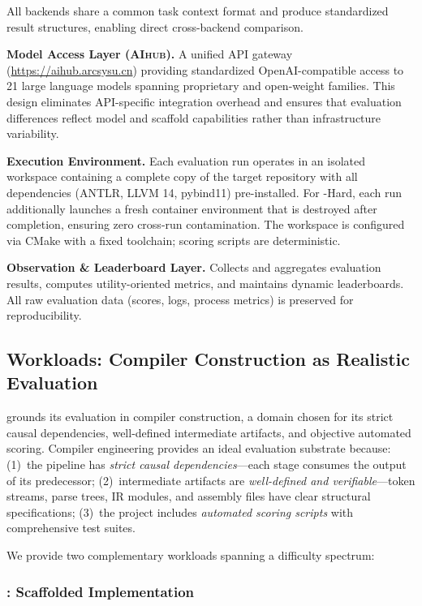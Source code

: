 All backends share a common task context format and produce standardized result structures, enabling direct cross-backend comparison.

\textbf{Model Access Layer (\textsc{AIhub}).}
A unified API gateway (\url{https://aihub.arcsysu.cn}) providing standardized OpenAI-compatible access to 21 large language models spanning proprietary and open-weight families.
This design eliminates API-specific integration overhead and ensures that evaluation differences reflect model and scaffold capabilities rather than infrastructure variability.

\textbf{Execution Environment.}
Each evaluation run operates in an isolated workspace containing a complete copy of the target repository with all dependencies (ANTLR, LLVM 14, pybind11) pre-installed.
For \yatcc{}-Hard, each run additionally launches a fresh container environment that is destroyed after completion, ensuring zero cross-run contamination.
The workspace is configured via CMake with a fixed toolchain; scoring scripts are deterministic.

\textbf{Observation \& Leaderboard Layer.}
Collects and aggregates evaluation results, computes utility-oriented metrics, and maintains dynamic leaderboards.
All raw evaluation data (scores, logs, process metrics) is preserved for reproducibility.


\subsection{Workloads: Compiler Construction as Realistic Evaluation}

\eva{} grounds its evaluation in compiler construction, a domain chosen for its strict causal dependencies, well-defined intermediate artifacts, and objective automated scoring.
Compiler engineering provides an ideal evaluation substrate because: (1)~the pipeline has \emph{strict causal dependencies}---each stage consumes the output of its predecessor; (2)~intermediate artifacts are \emph{well-defined and verifiable}---token streams, parse trees, IR modules, and assembly files have clear structural specifications; (3)~the project includes \emph{automated scoring scripts} with comprehensive test suites.

We provide two complementary workloads spanning a difficulty spectrum:

\subsubsection{\yatcc{}: Scaffolded Implementation}


